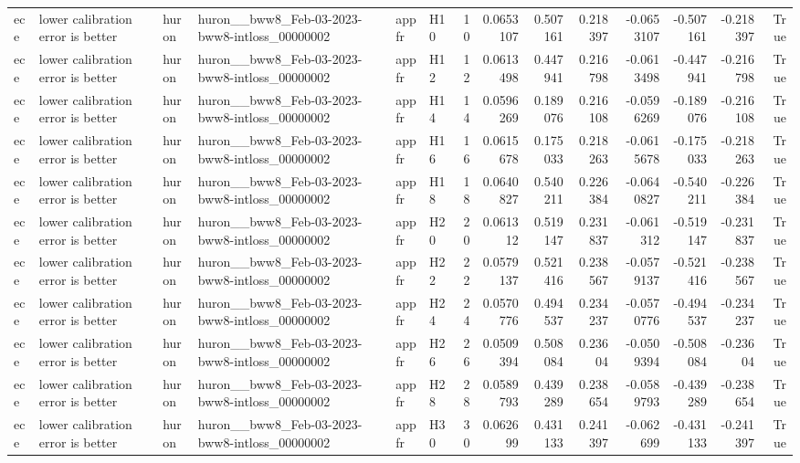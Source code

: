 \begin{longtable}{llllllrrrrrrrr}
ece & lower calibration error is better & huron & huron\_\_bww8\_Feb-03-2023-bww8-intloss\_00000002 & appfr & H10 & 10 & 0.0653107 & 0.507161 & 0.218397 & -0.0653107 & -0.507161 & -0.218397 & True \\
ece & lower calibration error is better & huron & huron\_\_bww8\_Feb-03-2023-bww8-intloss\_00000002 & appfr & H12 & 12 & 0.0613498 & 0.447941 & 0.216798 & -0.0613498 & -0.447941 & -0.216798 & True \\
ece & lower calibration error is better & huron & huron\_\_bww8\_Feb-03-2023-bww8-intloss\_00000002 & appfr & H14 & 14 & 0.0596269 & 0.189076 & 0.216108 & -0.0596269 & -0.189076 & -0.216108 & True \\
ece & lower calibration error is better & huron & huron\_\_bww8\_Feb-03-2023-bww8-intloss\_00000002 & appfr & H16 & 16 & 0.0615678 & 0.175033 & 0.218263 & -0.0615678 & -0.175033 & -0.218263 & True \\
ece & lower calibration error is better & huron & huron\_\_bww8\_Feb-03-2023-bww8-intloss\_00000002 & appfr & H18 & 18 & 0.0640827 & 0.540211 & 0.226384 & -0.0640827 & -0.540211 & -0.226384 & True \\
ece & lower calibration error is better & huron & huron\_\_bww8\_Feb-03-2023-bww8-intloss\_00000002 & appfr & H20 & 20 & 0.061312 & 0.519147 & 0.231837 & -0.061312 & -0.519147 & -0.231837 & True \\
ece & lower calibration error is better & huron & huron\_\_bww8\_Feb-03-2023-bww8-intloss\_00000002 & appfr & H22 & 22 & 0.0579137 & 0.521416 & 0.238567 & -0.0579137 & -0.521416 & -0.238567 & True \\
ece & lower calibration error is better & huron & huron\_\_bww8\_Feb-03-2023-bww8-intloss\_00000002 & appfr & H24 & 24 & 0.0570776 & 0.494537 & 0.234237 & -0.0570776 & -0.494537 & -0.234237 & True \\
ece & lower calibration error is better & huron & huron\_\_bww8\_Feb-03-2023-bww8-intloss\_00000002 & appfr & H26 & 26 & 0.0509394 & 0.508084 & 0.23604 & -0.0509394 & -0.508084 & -0.23604 & True \\
ece & lower calibration error is better & huron & huron\_\_bww8\_Feb-03-2023-bww8-intloss\_00000002 & appfr & H28 & 28 & 0.0589793 & 0.439289 & 0.238654 & -0.0589793 & -0.439289 & -0.238654 & True \\
ece & lower calibration error is better & huron & huron\_\_bww8\_Feb-03-2023-bww8-intloss\_00000002 & appfr & H30 & 30 & 0.062699 & 0.431133 & 0.241397 & -0.062699 & -0.431133 & -0.241397 & True \\

\end{longtable}

